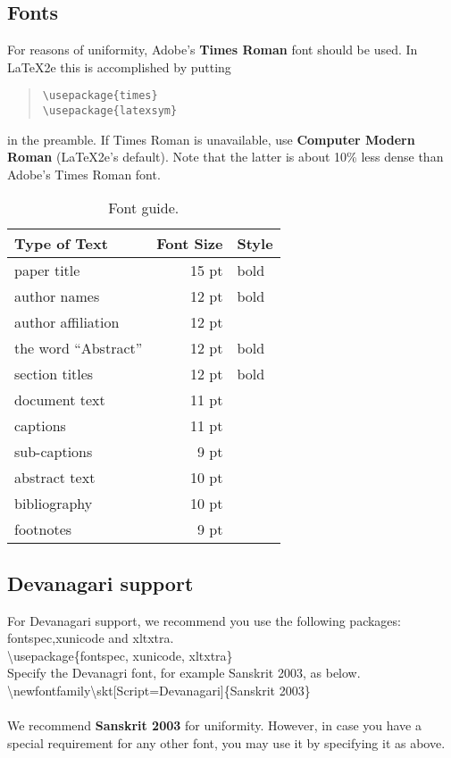 \documentclass[11pt]{article}
\begin{document}
\subsection{Fonts}
For reasons of uniformity, Adobe's {\bf Times Roman} font should be
used. In \LaTeX2e{} this is accomplished by putting

\begin{quote}
\begin{verbatim}
\usepackage{times}
\usepackage{latexsym}
\end{verbatim}
\end{quote}
in the preamble. If Times Roman is unavailable, use {\bf Computer
  Modern Roman} (\LaTeX2e{}'s default).  Note that the latter is about
  10\% less dense than Adobe's Times Roman font.

\begin{table}[h]
\begin{center}
\begin{tabular}{|l|rl|}
\hline \bf Type of Text & \bf Font Size & \bf Style \\ \hline
paper title & 15 pt & bold \\
author names & 12 pt & bold \\
author affiliation & 12 pt & \\
the word ``Abstract'' & 12 pt & bold \\
section titles & 12 pt & bold \\
document text & 11 pt  &\\
captions & 11 pt & \\
sub-captions & 9 pt & \\
abstract text & 10 pt & \\
bibliography & 10 pt & \\
footnotes & 9 pt & \\
\hline
\end{tabular}
\end{center}
\caption{\label{font-table} Font guide. }
\end{table}

\subsection{Devanagari support}
For Devanagari support, we recommend you use the following packages: fontspec,xunicode and xltxtra. \\
\textbackslash usepackage\{fontspec, xunicode, xltxtra\}\\
Specify the Devanagri font, for example Sanskrit 2003, as below.\\
\textbackslash newfontfamily\textbackslash skt[Script=Devanagari]\{Sanskrit 2003\}\\ \\
We recommend {\bf Sanskrit 2003} for uniformity. However, in case you have a special requirement for any other font, you may use it by specifying it as above.\\
\end{document}
